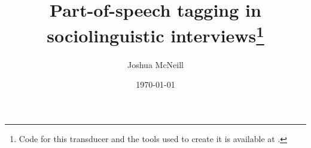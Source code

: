 \documentclass{article}
\title{Part-of-speech tagging in sociolinguistic interviews\footnote{Code for this transducer and the tools used to create it is available at \url{}.}}
\author{Joshua McNeill}
\date{\today}
\begin{document}
  \maketitle
  \begin{abstract}

  \end{abstract}

\end{document}
